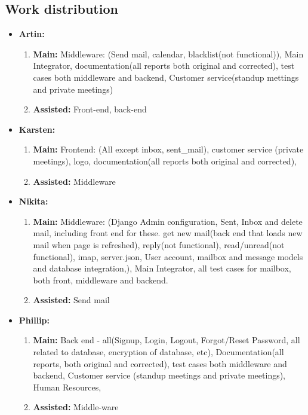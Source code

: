 \documentclass{article}
\begin{document}
\subsection*{Work distribution}
\begin{itemize}
    \item \textbf{Artin:}
    \begin{enumerate}
        \item \textbf{Main:} Middleware: (Send mail, calendar, blacklist(not functional)), Main Integrator, documentation(all reports both original and corrected), test cases both middleware and backend, Customer service(standup mettings and private meetings)
        \item \textbf{Assisted:} Front-end, back-end
    \end{enumerate}
    \item \textbf{Karsten:}
    \begin{enumerate}
        \item \textbf{Main:} Frontend: (All except inbox, sent\_mail), customer service (private meetings), logo, documentation(all reports both original and corrected), 
        \item \textbf{Assisted:} Middleware
    \end{enumerate}
    \item \textbf{Nikita:}
    \begin{enumerate}
        \item \textbf{Main:} Middleware: (Django Admin configuration, Sent, Inbox and delete mail, including front end for these. get new mail(back end that loads new mail when page is refreshed),
        reply(not functional), read/unread(not functional), imap, server.json, User account, mailbox and message models and database integration,), Main Integrator, all test cases for mailbox, both front, middleware and backend.
        \item \textbf{Assisted:} Send mail
    \end{enumerate}
    \item \textbf{Phillip:}
    \begin{enumerate}
        \item \textbf{Main:} Back end - all(Signup, Login, Logout, Forgot/Reset Password, all related to database, encryption of database, etc), Documentation(all reports, both original and corrected), test cases both middleware and backend, Customer service (standup meetings and private meetings), Human Resources, 
        \item \textbf{Assisted:} Middle-ware
    \end{enumerate}
\end{itemize}

\printindex[Alphabetical]
\printindex[Functions]
\end{document}
